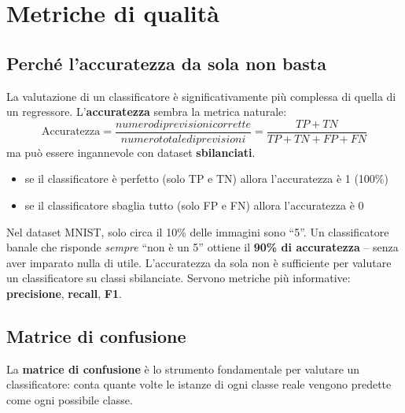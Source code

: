 \section{Metriche di qualità}
\subsection{Perché l'accuratezza da sola non basta}
La valutazione di un classificatore è significativamente più complessa di quella di un regressore. L'\textbf{accuratezza} sembra la metrica naturale:
\[
\text{Accuratezza} = \frac{numero di previsioni corrette}{numero totale di previsioni}= \frac{TP + TN}{TP + TN + FP + FN}
\]
ma può essere ingannevole con dataset \textbf{sbilanciati}.

\begin{itemize}
    \item se il classificatore è perfetto (solo TP e TN) allora l'accuratezza è 1 (100\%)
    \item se il classificatore sbaglia tutto (solo FP e FN) allora l'accuratezza è 0
\end{itemize}

\begin{warnbox}
Nel dataset MNIST, solo circa il 10\% delle immagini sono ``5''. Un classificatore banale che risponde \emph{sempre} ``non è un 5'' ottiene il \textbf{90\% di accuratezza} -- senza aver imparato nulla di utile. L'accuratezza da sola non è sufficiente per valutare un classificatore su classi sbilanciate. Servono metriche più informative: \textbf{precisione}, \textbf{recall}, \textbf{F1}.
\end{warnbox}

\subsection{Matrice di confusione}

La \textbf{matrice di confusione} è lo strumento fondamentale per valutare un classificatore: conta quante volte le istanze di ogni classe reale vengono predette come ogni possibile classe.

